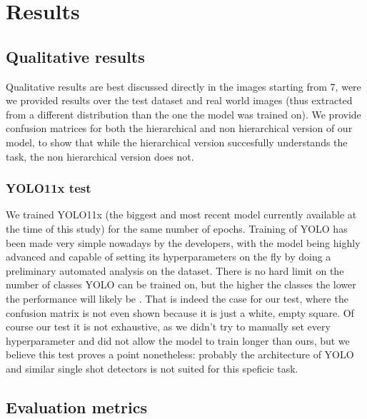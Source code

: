 \section{Results}
\label{sec:results}

\subsection{Qualitative results}

Qualitative results are best discussed directly in the images starting from 7, were we provided results over the test dataset and real world images (thus extracted from a different distribution than the one the model was trained on).
We provide confusion matrices for both the hierarchical and non hierarchical version of our model, to show that while the hierarchical version succesfully understands the task, the non hierarchical version does not.

\subsubsection{YOLO11x test}

We trained YOLO11x (the biggest and most recent model currently available at the time of this study) for the same number of epochs. Training of YOLO has been made very simple nowadays by the developers, with the model being highly advanced and capable of setting its hyperparameters on the fly by doing a preliminary automated analysis on the dataset. There is no hard limit on the number of classes YOLO can be trained on, but the higher the classes the lower the performance will likely be \cite{UltralyticsIssue}. That is indeed the case for our test, where the confusion matrix is not even shown because it is just a white, empty square. Of course our test it is not exhaustive, as we didn't try to manually set every hyperparameter and did not allow the model to train longer than ours, but we believe this test proves a point nonetheless: probably the architecture of YOLO and similar single shot detectors is not suited for this speficic task.

\subsection{Evaluation metrics}

